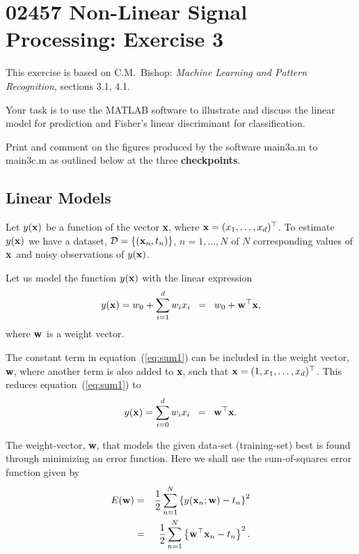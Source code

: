 \documentclass[times,12pt]{article}    %
\def\x{{\bf x}}
\def\w{{\bf w}}
\def\D{\mathcal{D}}
\begin{document}
\section*{02457 Non-Linear Signal Processing: Exercise 3}

This exercise is based on C.M.~Bishop: {\it Machine Learning and
Pattern Recognition}, sections 3.1, 4.1.

Your task is to use the MATLAB software to illustrate and discuss the
linear model for prediction and Fisher's linear
discriminant for classification.

Print and comment on the figures produced by the software {\sf
  main3a.m} to {\sf main3c.m} as outlined below at the three {\bf
  checkpoints}.

\subsection*{Linear Models}
Let  $y(\x)$ be a function of the vector \x, where
$\x=(x_1,\ldots,x_d)^\top$. To estimate $y(\x)$  we have a
dataset, $\D = \left\{ (\x_n,t_n) \right\}$, $
n=1,\ldots,N$ of $N$ corresponding values of \x\ and noisy observations of $y(\x)$.

Let us model the function $y(\x)$ with the linear expression
\begin{equation}
  \label{eq:sum1}
  y(\x) = w_0 + \sum_{i=1}^d w_i x_i \;\; = \;\; w_0 + \w^\top \x,
\end{equation}
where \w\ is a weight vector.

The constant term in equation~(\ref{eq:sum1}) can be included in the
weight vector, \w, where another term is also added to \x, such that
$\x=(1,x_1,\ldots,x_d)^\top$. This reduces equation~(\ref{eq:sum1}) to
\begin{equation}
  \label{eq:sum2}
  y(\x) = \sum_{i=0}^d w_i x_i \;\; = \;\; \w^\top \x.
\end{equation}

The weight-vector, \w, that models the given data-set (training-set)
best is found through minimizing an error function. Here we shall use the
sum-of-squares error function given by
\begin{eqnarray}
  \label{eq:error1}
  E(\w) &=& \frac{1}{2} \sum_{n=1}^N \left\{ y(\x_n;\w)-t_n
  \right\}^2\\
  \label{eq:error2}
       &=&  \frac{1}{2} \sum_{n=1}^N \left\{ \w^\top\x_n -t_n  \right\}^2.
\end{eqnarray}
\end{document}
